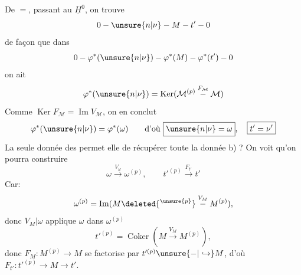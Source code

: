 De $=$, passant au $\underline H^0$, on trouve
\margin{$\left[\begin{aligned}
\unsure{n|\nu}&=\underline H^0(\ell_\bullet[-1])\\
&=\underline H^{-1}(\ell_\bullet)\\
t'&=\underline H^0(\check\ell'_\bullet)
\end{aligned}\right]$}
\[
0\mathbin{-}\unsure{n|\nu}\mathbin{-}M\mathbin{-}t'\mathbin{-}0
\]
de façon que dans
\[
0\mathbin{-}\varphi^*(\unsure{n|\nu})\mathbin{-}\varphi^*(M)\mathbin{-}\varphi^*(t')\mathbin{-}0
\]
on ait
\[
\varphi^*(\unsure{n|\nu})=\operatorname{Ker}(\mathcal M^{(p)}\overset{F_{\mathcal M}}{\mathbin{-}}\mathcal M)
\]
Comme $\operatorname{Ker}F_{\mathcal M}=\operatorname{Im}V_{\mathcal M}$, on en conclut
\[
\varphi^*(\unsure{n|\nu})=\varphi^*(\omega)\qquad\text{d'où }\boxed{\unsure{n|\nu}=\omega},\quad\boxed{t'=\nu'}
\]
La seule donnée des  permet elle de récupérer toute la donnée b) ? On voit qu'on pourra construire
\[
\omega\xrightarrow{V_\omega}\omega^{(p)},\qquad t'^{(p)}\xrightarrow{F_{t'}}t'
\]
Car:
\[
\omega^{(p)}=\operatorname{Im}(M\deleted{^{\unsure{p}}}\overset{V_M}{\mathbin{-}}M^{(p)}),
\]
donc $V_M|\omega$ applique $\omega$ dans $\omega^{(p)}$
\[
t'^{(p)}=\operatorname{Coker}(M\xrightarrow{V_M}M^{(p)}),
\]
donc $F_M:M^{(p)}\to M$ se factorise par $t'^{(p)}\unsure{\mathbin{-}|\hookrightarrow}M$, d'où $F_{t'}:t'^{(p)}\to M\to t'$.

